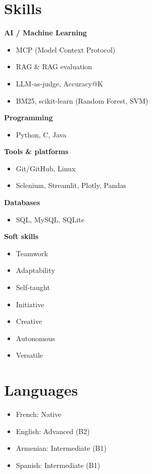\documentclass[9.5pt]{article}
\begin{document}
\hfill
\begin{minipage}[t]{0.305\textwidth}

\section*{\large\bfseries\color{accent}Skills}
\vspace{-2pt}
\small
\textbf{AI / Machine Learning}
\begin{itemize}
  \item MCP (Model Context Protocol)
  \item RAG \& RAG evaluation
  \item LLM-as-judge, Accuracy@K
  \item BM25, scikit-learn (Random Forest, SVM)
\end{itemize}
\vspace{2pt}
\textbf{Programming}
\begin{itemize}
  \item Python, C, Java
\end{itemize}
\vspace{2pt}
\textbf{Tools \& platforms}
\begin{itemize}
  \item Git/GitHub, Linux
  \item Selenium, Streamlit, Plotly, Pandas
\end{itemize}
\vspace{2pt}
\textbf{Databases}
\begin{itemize}
  \item SQL, MySQL, SQLite
\end{itemize}
\vspace{2pt}
\textbf{Soft skills}
\begin{itemize}
  \item Teamwork
  \item Adaptability
  \item Self-taught
  \item Initiative
  \item Creative
  \item Autonomous
  \item Versatile
\end{itemize}

\section*{\large\bfseries\color{accent}Languages}
\vspace{-2pt}
\small
\begin{itemize}
  \item French: Native
  \item English: Advanced (B2)
  \item Armenian: Intermediate (B1)
  \item Spanish: Intermediate (B1)
\end{itemize}


\end{minipage}
\end{document}
